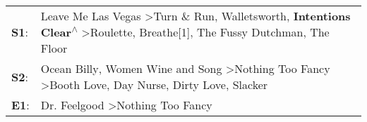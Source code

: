 \begin{supertabular}{p{0.03\textwidth}p{0.92\textwidth}}
 \textbf{S1}:  &  Leave Me Las Vegas\textsuperscript{} \textgreater \enspace Turn \& Run\textsuperscript{}, \enspace Walletsworth\textsuperscript{}, \enspace \textbf{Intentions Clear\textsuperscript{$\wedge$}} \textgreater \enspace Roulette\textsuperscript{}, \enspace Breathe[1]\textsuperscript{}, \enspace The Fussy Dutchman\textsuperscript{}, \enspace The Floor\textsuperscript{}  \enspace  \\
 \textbf{S2}:  &                                                                   Ocean Billy\textsuperscript{}, \enspace Women Wine and Song\textsuperscript{} \textgreater \enspace Nothing Too Fancy\textsuperscript{} \textgreater \enspace Booth Love\textsuperscript{}, \enspace Day Nurse\textsuperscript{}, \enspace Dirty Love\textsuperscript{}, \enspace Slacker\textsuperscript{}  \enspace  \\
 \textbf{E1}:  &                                                                                                                                                                                                                                                                                      Dr. Feelgood\textsuperscript{} \textgreater \enspace Nothing Too Fancy\textsuperscript{}  \enspace  \\
\end{supertabular}
